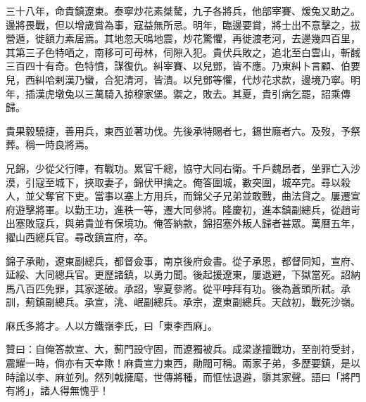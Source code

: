 \begin{pinyinscope}
三十八年，命貴鎮遼東。泰寧炒花素桀驁，九子各將兵，他部宰賽、煖兔又助之。邊將畏戰，但以增歲賞為事，寇益無所忌。明年，臨邊要賞，將士出不意擊之，拔營遁，徙額力素居焉。其地忽天鳴地震，炒花驚懼，再徙渡老河，去邊幾四百里，其第三子色特哂之，南移可可毋林，伺隙入犯。貴伏兵敗之，追北至白雲山，斬馘三百四十有奇。色特憤，謀復仇。糾宰賽、以兒鄧，皆不應。乃東糾卜言顧、伯要兒，西糾哈剌漢乃蠻，合犯清河，皆潰。以兒鄧等懼，代炒花求款，邊境乃寧。明年，插漢虎墩兔以三萬騎入掠穆家堡。禦之，敗去。其夏，貴引病乞罷，詔乘傳歸。

貴果毅驍捷，善用兵，東西並著功伐。先後承特賜者七，錫世廕者六。及歿，予祭葬。稱一時良將焉。

兄錦，少從父行陣，有戰功。累官千總，協守大同右衛。千戶魏昂者，坐罪亡入沙漠，引寇至城下，挾取妻子，錦伏甲擒之。俺答圍城，數突圍，城卒完。尋以殺人，並父奪官下吏。當事以塞上方用兵，而錦父子兄弟並敢戰，曲法貸之。屢遷宣府遊擊將軍。以勤王功，進秩一等，遷大同參將。隆慶初，進本鎮副總兵，從趙岢出塞敗寇兵，與弟貴並有保境功。俺答納款，錦招塞外叛人歸者甚眾。萬曆五年，擢山西總兵官。尋改鎮宣府，卒。

錦子承勛，遼東副總兵，都督僉事，南京後府僉書。從子承恩，都督同知，宣府、延綏、大同總兵官。更歷諸鎮，以勇力聞。後起援遼東，屢退避，下獄當死。詔納馬八百匹免罪，其家遂破。承詔，寧夏參將。從平哱拜有功。後為蒼頭所弒。承訓，薊鎮副總兵。承宣，洮、岷副總兵。承宗，遼東副總兵。天啟初，戰死沙嶺。

麻氏多將才。人以方鐵嶺李氏，曰「東李西麻」。

贊曰：自俺答款宣、大，薊門設守固，而遼獨被兵。成梁遂擅戰功，至剖符受封，震耀一時，倘亦有天幸歟！麻貴宣力東西，勛閥可稱。兩家子弟，多歷要鎮，是以時論以李、麻並列。然列戟擁麾，世傳將種，而恇怯退避，隳其家聲。語曰「將門有將」，諸人得無愧乎！


\end{pinyinscope}